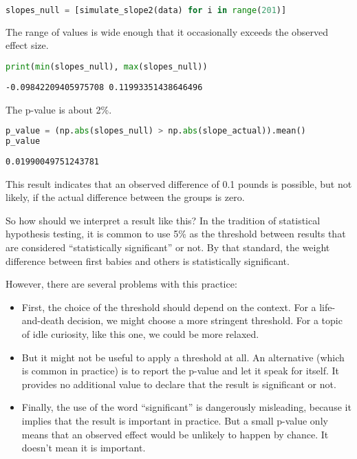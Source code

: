 \begin{lstlisting}[language=Python,style=source]
slopes_null = [simulate_slope2(data) for i in range(201)]
\end{lstlisting}

The range of values is wide enough that it occasionally exceeds the
observed effect size.

\begin{lstlisting}[language=Python,style=source]
print(min(slopes_null), max(slopes_null))
\end{lstlisting}

\begin{lstlisting}[style=output]
-0.09842209405975708 0.11993351438646496
\end{lstlisting}

The p-value is about 2\%.

\begin{lstlisting}[language=Python,style=source]
p_value = (np.abs(slopes_null) > np.abs(slope_actual)).mean()
p_value
\end{lstlisting}

\begin{lstlisting}[style=output]
0.01990049751243781
\end{lstlisting}

This result indicates that an observed difference of 0.1 pounds is
possible, but not likely, if the actual difference between the groups is
zero.

So how should we interpret a result like this? In the tradition of
statistical hypothesis testing, it is common to use 5\% as the threshold
between results that are considered ``statistically significant'' or
not. By that standard, the weight difference between first babies and
others is statistically significant.

However, there are several problems with this practice:

\begin{itemize}
\item
  First, the choice of the threshold should depend on the context. For a
  life-and-death decision, we might choose a more stringent threshold.
  For a topic of idle curiosity, like this one, we could be more
  relaxed.
\item
  But it might not be useful to apply a threshold at all. An alternative
  (which is common in practice) is to report the p-value and let it
  speak for itself. It provides no additional value to declare that the
  result is significant or not.
\item
  Finally, the use of the word ``significant'' is dangerously
  misleading, because it implies that the result is important in
  practice. But a small p-value only means that an observed effect would
  be unlikely to happen by chance. It doesn't mean it is important.
\end{itemize}

